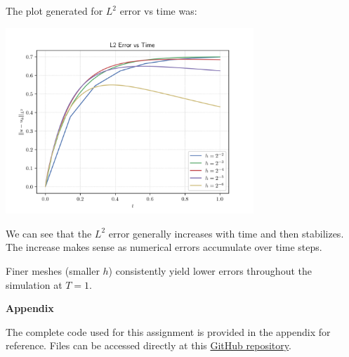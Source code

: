 \documentclass[12pt]{article}
\newcounter{question}
\newcommand{\startappendix}{%
    \newpage
    \vspace{1em}
    {\Large\textbf{Appendix}}

    The complete code used for this assignment is provided in the appendix for reference. Files can be accessed directly at this \href{https://github.com/sjsusu/numerical_analysis}{GitHub repository}.
}
\begin{document}
\newpage
The plot generated for $L^2$ error vs time was:
\begin{center}
\includegraphics[width=0.7\textwidth]{../outputs_3/burgers_rk4_error_vs_time.png}
\end{center}

We can see that the $L^2$ error generally increases with time and then stabilizes. The increase makes sense as numerical errors accumulate over time steps.
 
Finer meshes (smaller $h$) consistently yield lower errors throughout the simulation at $T=1$.

\startappendix




\end{document}
